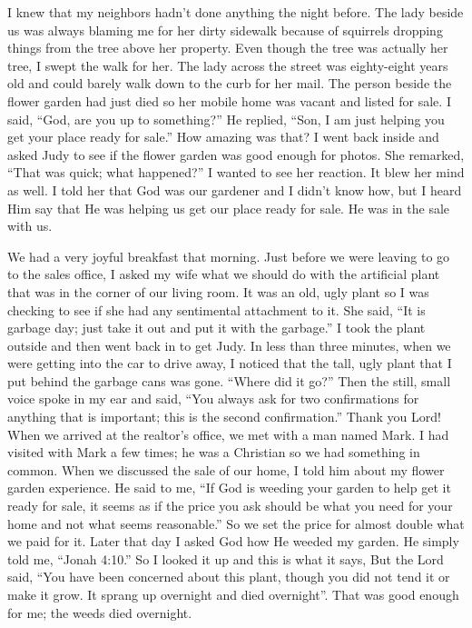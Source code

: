 \documentclass[oneside]{book}
\begin{document}
I knew that my neighbors hadn’t done anything the night before. The lady beside us was always blaming me for her dirty sidewalk because of squirrels dropping things from the tree above her property. Even though the tree was actually her tree, I swept the walk for her. The lady across the street was eighty-eight years old and could barely walk down to the curb for her mail. The person beside the flower garden had just died so her mobile home was vacant and listed for sale. I said, “God, are you up to something?” He replied, “Son, I am just helping you get your place ready for sale.” How amazing was that? I went back inside and asked Judy to see if the flower garden was good enough for photos. She remarked, “That was quick; what happened?” I  wanted to see her reaction. It blew her mind as well. I told her that God was our gardener and I didn’t know how, but I heard Him say that He was helping us get our place ready for sale. He was in the sale with us.

We had a very joyful breakfast that morning. Just before we were leaving to go to the sales office, I asked my wife what we should do with the artificial plant that was in the corner of our living room. It was an old, ugly plant so I was checking to see if she had any sentimental attachment to it. She said, “It is garbage day; just take it out and put it with the garbage.” I took the plant outside and then went back in to get Judy. In less than three minutes, when we were getting into the car to drive away, I noticed that the tall, ugly plant that I put behind the garbage cans was gone. “Where did it go?” Then the still, small voice spoke in my ear and said, “You always ask for two confirmations for anything that is important; this is the second confirmation.” Thank you Lord! When we arrived at the realtor’s office, we met with a man named Mark. I had visited with Mark a few times; he was a Christian so we had something in common. When we discussed the sale of our home, I told him about my flower garden experience. He said to me, “If God is weeding your garden to help get it ready for sale, it seems as if the price you ask should be what you need for your home and not what seems reasonable.” So we set the price for almost double what we paid for it. Later that day I asked God how He weeded my garden. He simply told me, “Jonah 4:10.” So I looked it up and this is what it says, But the Lord said, “You have been concerned about this plant, though you did not tend it or make it grow. It sprang up overnight and died overnight”. That was good enough for me; the weeds died overnight.
\end{document}
